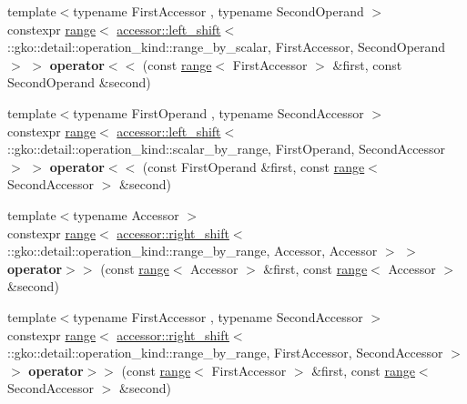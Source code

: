 \begin{DoxyCompactItemize}
\item 
\mbox{\label{namespacegko_a34302fcd90695bfd2e0267da0454c8b9}} 
{\footnotesize template$<$typename First\+Accessor , typename Second\+Operand $>$ }\\constexpr \hyperlink{classgko_1_1range}{range}$<$ \hyperlink{structgko_1_1accessor_1_1left__shift}{accessor\+::left\+\_\+shift}$<$ \+::gko\+::detail\+::operation\+\_\+kind\+::range\+\_\+by\+\_\+scalar, First\+Accessor, Second\+Operand $>$ $>$ {\bfseries operator$<$$<$} (const \hyperlink{classgko_1_1range}{range}$<$ First\+Accessor $>$ \&first, const Second\+Operand \&second)
\item 
\mbox{\label{namespacegko_aeeaf5e40ac6cca7985630beed38975e0}} 
{\footnotesize template$<$typename First\+Operand , typename Second\+Accessor $>$ }\\constexpr \hyperlink{classgko_1_1range}{range}$<$ \hyperlink{structgko_1_1accessor_1_1left__shift}{accessor\+::left\+\_\+shift}$<$ \+::gko\+::detail\+::operation\+\_\+kind\+::scalar\+\_\+by\+\_\+range, First\+Operand, Second\+Accessor $>$ $>$ {\bfseries operator$<$$<$} (const First\+Operand \&first, const \hyperlink{classgko_1_1range}{range}$<$ Second\+Accessor $>$ \&second)
\item 
\mbox{\label{namespacegko_a787e41cf20d8dbf332b38f9e6bd014c8}} 
{\footnotesize template$<$typename Accessor $>$ }\\constexpr \hyperlink{classgko_1_1range}{range}$<$ \hyperlink{structgko_1_1accessor_1_1right__shift}{accessor\+::right\+\_\+shift}$<$ \+::gko\+::detail\+::operation\+\_\+kind\+::range\+\_\+by\+\_\+range, Accessor, Accessor $>$ $>$ {\bfseries operator$>$$>$} (const \hyperlink{classgko_1_1range}{range}$<$ Accessor $>$ \&first, const \hyperlink{classgko_1_1range}{range}$<$ Accessor $>$ \&second)
\item 
\mbox{\label{namespacegko_a44870f0181208f0e356c0510ef136f0a}} 
{\footnotesize template$<$typename First\+Accessor , typename Second\+Accessor $>$ }\\constexpr \hyperlink{classgko_1_1range}{range}$<$ \hyperlink{structgko_1_1accessor_1_1right__shift}{accessor\+::right\+\_\+shift}$<$ \+::gko\+::detail\+::operation\+\_\+kind\+::range\+\_\+by\+\_\+range, First\+Accessor, Second\+Accessor $>$ $>$ {\bfseries operator$>$$>$} (const \hyperlink{classgko_1_1range}{range}$<$ First\+Accessor $>$ \&first, const \hyperlink{classgko_1_1range}{range}$<$ Second\+Accessor $>$ \&second)

\end{DoxyCompactItemize}
